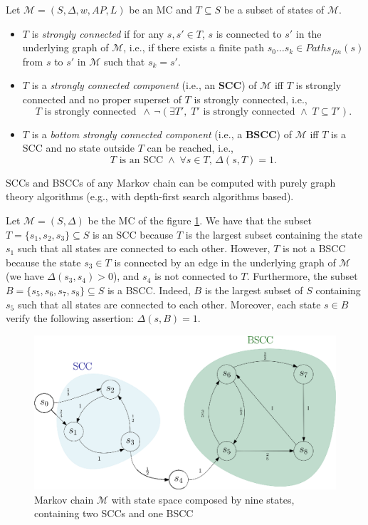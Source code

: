 \begin{definition}
Let $\mathcal{M}=(S, \Delta, w, AP, L)$ be an MC and $T \subseteq S$ be a subset of states of $\mathcal{M}$.
\begin{itemize}
  \item $T$ is \textit{strongly connected} if for any $s, s' \in T$, $s$ is connected to $s'$ in the underlying graph of $\mathcal{M}$, i.e., if there exists a finite path $s_0 \dots s_k \in Paths_{fin}(s)$ from $s$ to $s'$ in $\mathcal{M}$ such that $s_k = s'$.
  \item $T$ is a \textit{strongly connected component} (i.e., an \textbf{SCC}) of $\mathcal{M}$ iff $T$ is strongly connected and no proper superset of $T$ is strongly connected, i.e.,
  \[ T \text{ is strongly connected } \, \wedge \,
  \neg(\exists T', \; T' \text{ is strongly connected } \wedge \;
    T \subseteq T'). \]
  \item $T$ is a \textit{bottom strongly connected component} (i.e., a \textbf{BSCC}) of $\mathcal{M}$ iff
  $T$ is a SCC and no state outside $T$ can be reached, i.e.,
  \[
  T \text{ is an SCC} \; \wedge \; \forall s \in T, \,\Delta(s, T) = 1.
  \]
\end{itemize}
\end{definition}

SCCs and BSCCs of any Markov chain can be computed with
purely graph theory algorithms (e.g., with depth-first search algorithms based).

\begin{example}
Let $\mathcal{M}=(S, \Delta)$ be the MC of the figure \ref{bsccex}. We have that the subset $T = \{s_1, s_2, s_3\} \subseteq S$ is an SCC because $T$ is the largest subset containing the state $s_1$ such that all states are connected to each other.
However, $T$ is not a BSCC because the state $s_3 \in T$ is connected by an edge in the underlying graph of $\mathcal{M}$ (we have $\Delta(s_3, s_4) > 0$), and $s_4$ is not connected to $T$.
Furthermore, the subset $B = \{s_5, s_6, s_7, s_8\} \subseteq S$ is a BSCC. Indeed, $B$ is the largest subset of $S$ containing $s_5$ such that all states are connected to each other. Moreover, each state $s \in B$ verify the following assertion:
$\Delta(s, B)=1$.
  \begin{figure}[h!]
    \centering
    \includegraphics[width=0.7\linewidth]{resources/BSCC}
    \captionsetup{justification=centering}
    \caption{Markov chain $\mathcal{M}$ with state space composed by nine states, containing two SCCs and one BSCC}\label{bsccex}
  \end{figure}
\end{example}

